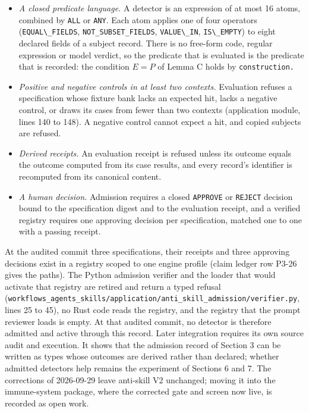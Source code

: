 \documentclass[
  11pt,
]{article}
\newcommand{\passthrough}[1]{#1}
\providecommand{\tightlist}{%
  \setlength{\itemsep}{0pt}\setlength{\parskip}{0pt}}
\begin{document}
\begin{itemize}
\tightlist
\item
  \emph{A closed predicate language.} A detector is an expression of at
  most 16 atoms, combined by \passthrough{\lstinline!ALL!} or
  \passthrough{\lstinline!ANY!}. Each atom applies one of four operators
  (\passthrough{\lstinline!EQUAL\_FIELDS!},
  \nolinkurl{NOT_SUBSET_FIELDS}, \passthrough{\lstinline!VALUE\_IN!},
  \passthrough{\lstinline!IS\_EMPTY!}) to eight declared fields of a
  subject record. There is no free-form code, regular expression or
  model verdict, so the predicate that is evaluated is the predicate
  that is recorded: the condition \(E = P\) of Lemma C holds by
  \nolinkurl{construction.}
\item
  \emph{Positive and negative controls in at least two contexts.}
  Evaluation refuses a specification whose fixture bank lacks an
  expected hit, lacks a negative control, or draws its cases from fewer
  than two contexts (application module, lines 140 to 148). A negative
  control cannot expect a hit, and copied subjects are refused.
\item
  \emph{Derived receipts.} An evaluation receipt is refused unless its
  outcome equals the outcome computed from its case results, and every
  record's identifier is recomputed from its canonical content.
\item
  \emph{A human decision.} Admission requires a closed
  \passthrough{\lstinline!APPROVE!} or \passthrough{\lstinline!REJECT!}
  decision bound to the specification digest and to the evaluation
  receipt, and a verified registry requires one approving decision per
  specification, matched one to one with a passing receipt.
\end{itemize}

At the audited commit three specifications, their receipts and three
approving decisions exist in a registry scoped to one engine profile
(claim ledger row P3-26 gives the paths). The Python admission verifier
and the loader that would activate that registry are retired and return
a typed refusal
(\nolinkurl{workflows_agents_skills/application/anti_skill_admission/verifier.py},
lines 25 to 45), no Rust code reads the registry, and the registry that
the prompt reviewer loads is empty. At that audited commit, no detector
is therefore admitted and active through this record. Later integration
requires its own source audit and execution. It shows that the admission
record of Section 3 can be written as types whose outcomes are derived
rather than declared; whether admitted detectors help remains the
experiment of Sections 6 and 7. The corrections of 2026-09-29 leave
anti-skill V2 unchanged; moving it into the immune-system package, where
the corrected gate and screen now live, is recorded as open work.
\end{document}

